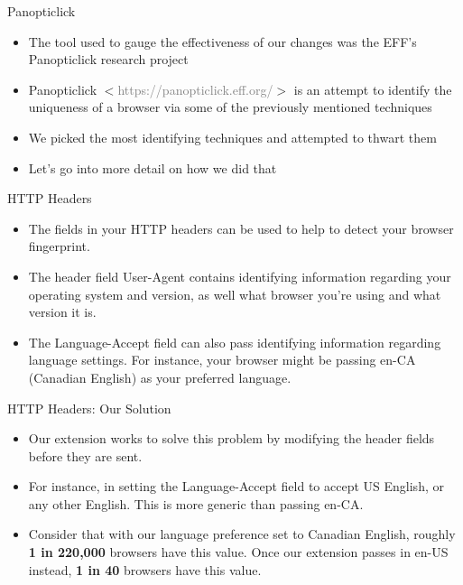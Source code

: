 \begin{frame}[fragile,t]{Panopticlick}
	\begin{itemize}
		\item The tool used to gauge the effectiveness of our changes was the EFF's Panopticlick research project
		\item Panopticlick $<$\textcolor{gray}{https://panopticlick.eff.org/}$>$ is an attempt to identify the uniqueness of a browser via some of the previously mentioned techniques
		\item We picked the most identifying techniques and attempted to thwart them
		\item Let's go into more detail on how we did that
	\end{itemize}
\end{frame}

\begin{frame}[fragile,t]{HTTP Headers}
	\begin{itemize}
		\item The fields in your HTTP headers can be used to help to detect your browser fingerprint.
		\item The header field User-Agent contains identifying information regarding your operating system and version, as well what browser you're using and what version it is.
		\item The Language-Accept field can also pass identifying information regarding language settings. For instance, your browser might be passing en-CA (Canadian English) as your preferred language.
	\end{itemize}
\end{frame}

\begin{frame}[fragile,t]{HTTP Headers: Our Solution}
	\begin{itemize}
		\item Our extension works to solve this problem by modifying the header fields before they are sent.
		\item For instance, in setting the Language-Accept field to accept US English, or any other English. This is more generic than passing en-CA.
		\item Consider that with our language preference set to Canadian English, roughly \textbf{1 in 220,000} browsers have this value. Once our extension passes in en-US instead, \textbf{1 in 40} browsers have this value. 
	\end{itemize}
\end{frame}

